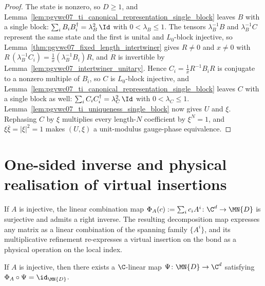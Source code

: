 \begin{proof}
    \leanok
    The state is nonzero, so $D\ge1$, and
    Lemma~\ref{lem:pgvwc07_ti_canonical_representation_single_block} leaves
    $B$ with a single block: $\sum_iB_iB_i^\dagger=\lambda_B^2\,\Id$ with
    $0<\lambda_B\le1$. The tensors $\lambda_B^{-1}B$ and $\lambda_B^{-1}C$
    represent the same state and the first is unital and $L_0$-block
    injective, so Lemma~\ref{thm:pgvwc07_fixed_length_intertwiner} gives
    $R\neq0$ and $x\neq0$ with $R\,(\lambda_B^{-1}C_i)=\tfrac1x(\lambda_B^{-1}B_i)R$,
    and $R$ is invertible by Lemma~\ref{lem:pgvwc07_intertwiner_unitary}.
    Hence $C_i=\tfrac1xR^{-1}B_iR$ is conjugate to a nonzero multiple of
    $B_i$, so $C$ is $L_0$-block injective, and
    Lemma~\ref{lem:pgvwc07_ti_canonical_representation_single_block} leaves
    $C$ with a single block as well:
    $\sum_iC_iC_i^\dagger=\lambda_C^2\,\Id$ with $0<\lambda_C\le1$.
    Lemma~\ref{lem:pgvwc07_ti_uniqueness_single_block} now gives $U$ and
    $\xi$. Rephasing $C$ by $\xi$ multiplies every length-$N$ coefficient by
    $\xi^N=1$, and $\xi\overline{\xi}=|\xi|^2=1$ makes $(U,\xi)$ a
    unit-modulus gauge-phase equivalence.
\end{proof}

\section{One-sided inverse and physical realisation of virtual insertions}%
\label{sec:decomposition_map}

If $A$ is injective, the linear combination map
$\Phi_A(c):=\sum_i c_iA^i\colon\C^d\to\MN{D}$
is surjective and admits a right inverse. The resulting decomposition map
expresses any matrix as a linear combination of the spanning family
$\{A^i\}$, and its multiplicative refinement re-expresses a virtual insertion
on the bond as a physical operation on the local index.

\begin{lemma}\label{lem:exists_rightInverse}
    \leanok
    If $A$ is injective, then there exists a $\C$-linear map
    $\Psi\colon\MN{D}\to\C^d$ satisfying
    $\Phi_A\circ\Psi=\id_{\MN{D}}$.
\end{lemma}

